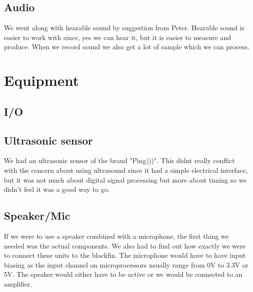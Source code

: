 \subsection{Audio}
We went along with hearable sound by suggestion from Peter. Hearable sound is easier to work with since, yes we can hear it, but it is easier to measure and produce. When we record sound we also get a lot of sample which we can process.

\section{Equipment}
\subsection{I/O}
\subsection{Ultrasonic sensor}
We had an ultrasonic sensor of the brand "Ping)))". This didnt really conflict with the concern about using ultrasound since it had a simple electrical interface, but it was not much about digital signal processing but more about timing so we didn't feel it was a good way to go.
\subsection{Speaker/Mic}
If we were to use a speaker combined with a microphone, the first thing we needed was the actual components. We also had to find out how exactly we were to connect these units to the blackfin. The microphone would have to have input biasing as the input channel on microprocessors usually range from 0V to 3.3V or 5V. The speaker would either have to be active or we would be connected to an amplifier. 
